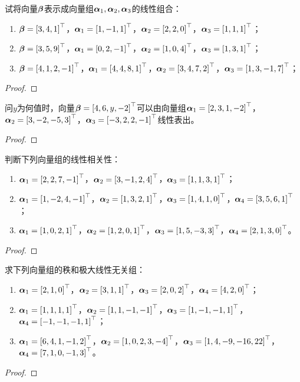 \begin{problem}
试将向量\(\vecbeta\)表示成向量组\(\vecal_1,\vecal_2,\vecal_3\)的线性组合：
\begin{enumerate}
    \item \(\vecbeta=\myvec{3,4,1}\)，\(\vecal_1=\myvec{1,-1,1}\)，\(\vecal_2=\myvec{2,2,0}\)，\(\vecal_3=\myvec{1,1,1}\)；
    \item \(\vecbeta=\myvec{3,5,9}\)，\(\vecal_1=\myvec{0,2,-1}\)，\(\vecal_2=\myvec{1,0,4}\)，\(\vecal_3=\myvec{1,3,1}\)；
    \item \(\vecbeta=\myvec{4,1,2,-1}\)，\(\vecal_1=\myvec{4,4,8,1}\)，\(\vecal_2=\myvec{3,4,7,2}\)，\(\vecal_3=\myvec{1,3,-1,7}\)；
\end{enumerate}
\end{problem}
\begin{proof}

\end{proof}

\begin{problem}
问\(y\)为何值时，向量\(\vecbeta=\myvec{4,6,y,-2}\)可以由向量组\(\vecal_1=\myvec{2,3,1,-2}\)，\(\vecal_2=\myvec{3,-2,-5,3}\)，\(\vecal_3=\myvec{-3,2,2,-1}\)线性表出。
\end{problem}
\begin{proof}

\end{proof}

\begin{problem}
判断下列向量组的线性相关性：
\begin{enumerate}
    \item \(\vecal_1=\myvec{2,2,7,-1}\)，\(\vecal_2=\myvec{3,-1,2,4}\)，\(\vecal_3=\myvec{1,1,3,1}\)；
    \item \(\vecal_1=\myvec{1,-2,4,-1}\)，\(\vecal_2=\myvec{1,3,2,1}\)，\(\vecal_3=\myvec{1,4,1,0}\)，\(\vecal_4=\myvec{3,5,6,1}\)；
    \item \(\vecal_1=\myvec{1,0,2,1}\)，\(\vecal_2=\myvec{1,2,0,1}\)，\(\vecal_3=\myvec{1,5,-3,3}\)，\(\vecal_4=\myvec{2,1,3,0}\)。
\end{enumerate}
\end{problem}
\begin{proof}

\end{proof}

\begin{problem}
求下列向量组的秩和极大线性无关组：
\begin{enumerate}
    \item \(\vecal_1=\myvec{2,1,0}\)，\(\vecal_2=\myvec{3,1,1}\)，\(\vecal_3=\myvec{2,0,2}\)，\(\vecal_4=\myvec{4,2,0}\)；
    \item \(\vecal_1=\myvec{1,1,1,1}\)，\(\vecal_2=\myvec{1,1,-1,-1}\)，\(\vecal_3=\myvec{1,-1,-1,1}\)，\(\vecal_4=\myvec{-1,-1,-1,1}\)；
    \item \(\vecal_1=\myvec{6,4,1,-1,2}\)，\(\vecal_2=\myvec{1,0,2,3,-4}\)，\(\vecal_3=\myvec{1,4,-9,-16,22}\)，\(\vecal_4=\myvec{7,1,0,-1,3}\)。
\end{enumerate}
\end{problem}
\begin{proof}

\end{proof}

